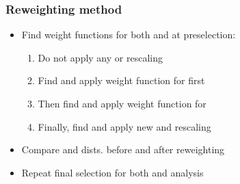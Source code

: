 \documentclass[bigger]{beamer}
\begin{document}
\begin{frame}
\frametitle{Reweighting method}
\label{sec-1-9-2}
\label{sec-1-9-2-1}

\begin{itemize}
\item Find weight functions for both \met and \mt at \enujj preselection:
\begin{enumerate}
\item Do not apply any \wjets or \ttbar rescaling
\item Find and apply weight function for \met first
\item Then find and apply weight function for \mt
\item Finally, find and apply new \wjets and \ttbar rescaling
\end{enumerate}
\item Compare \mt and \met dists. before and after reweighting
\item Repeat final selection for both \eejj and \enujj analysis
\end{itemize}
\end{frame}
\end{document}
